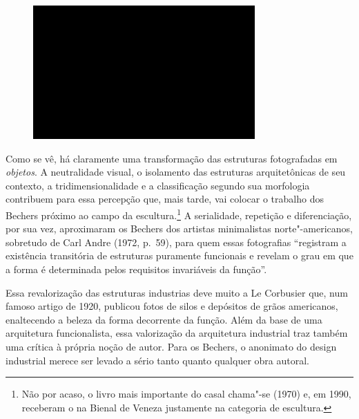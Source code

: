 \begin{figure}[!ht]

\centering
 \includegraphics[width=85mm]{./imgs/im1.jpg}
\caption{\tiny{}}

\end{figure}

Como se vê, há claramente uma transformação das estruturas fotografadas
em \emph{objetos}. A neutralidade visual, o isolamento das estruturas
arquitetônicas de seu contexto, a tridimensionalidade e a classificação
segundo sua morfologia contribuem para essa percepção que, mais tarde,
vai colocar o trabalho dos Bechers próximo ao campo da
escultura.\footnote{Não por acaso, o livro mais importante do casal
  chama"-se {} (1970) e, em 1990, receberam o
  {} na Bienal de Veneza justamente na categoria de
  escultura.} A serialidade, repetição e diferenciação, por sua vez,
aproximaram os Bechers dos artistas minimalistas norte"-americanos,
sobretudo de Carl Andre (1972, p.~59), para quem essas fotografias ``registram a
existência transitória de estruturas puramente funcionais e revelam o
grau em que a forma é determinada pelos requisitos invariáveis da
função''.

Essa revalorização das estruturas industrias deve muito a Le Corbusier
que, num famoso artigo de 1920, publicou fotos de silos e depósitos de
grãos americanos, enaltecendo a beleza da forma decorrente da função.
Além da base de uma arquitetura funcionalista, essa valorização da
arquitetura industrial traz também uma crítica à própria noção de autor.
Para os Bechers, o anonimato do design industrial merece ser levado a
sério tanto quanto qualquer obra autoral.


